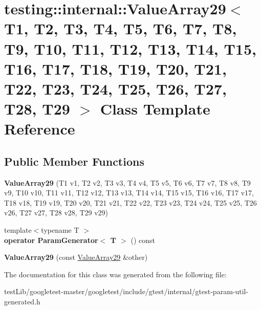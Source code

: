 \hypertarget{classtesting_1_1internal_1_1ValueArray29}{}\section{testing\+:\+:internal\+:\+:Value\+Array29$<$ T1, T2, T3, T4, T5, T6, T7, T8, T9, T10, T11, T12, T13, T14, T15, T16, T17, T18, T19, T20, T21, T22, T23, T24, T25, T26, T27, T28, T29 $>$ Class Template Reference}
\label{classtesting_1_1internal_1_1ValueArray29}
\subsection*{Public Member Functions}
\begin{DoxyCompactItemize}
\item 
\mbox{\label{classtesting_1_1internal_1_1ValueArray29_abd74fbc38f76f1e3baf28db3b6daa21a}} 
{\bfseries Value\+Array29} (T1 v1, T2 v2, T3 v3, T4 v4, T5 v5, T6 v6, T7 v7, T8 v8, T9 v9, T10 v10, T11 v11, T12 v12, T13 v13, T14 v14, T15 v15, T16 v16, T17 v17, T18 v18, T19 v19, T20 v20, T21 v21, T22 v22, T23 v23, T24 v24, T25 v25, T26 v26, T27 v27, T28 v28, T29 v29)
\item 
\mbox{\label{classtesting_1_1internal_1_1ValueArray29_ace48d673ae6e563b5bf1ceaa2512ad42}} 
{\footnotesize template$<$typename T $>$ }\\{\bfseries operator Param\+Generator$<$ T $>$} () const
\item 
\mbox{\label{classtesting_1_1internal_1_1ValueArray29_a4e5b252f7ffcd6380acc012ccf59a0f4}} 
{\bfseries Value\+Array29} (const \hyperlink{classtesting_1_1internal_1_1ValueArray29}{Value\+Array29} \&other)
\end{DoxyCompactItemize}


The documentation for this class was generated from the following file\+:\begin{DoxyCompactItemize}
\item 
test\+Lib/googletest-\/master/googletest/include/gtest/internal/gtest-\/param-\/util-\/generated.\+h\end{DoxyCompactItemize}
